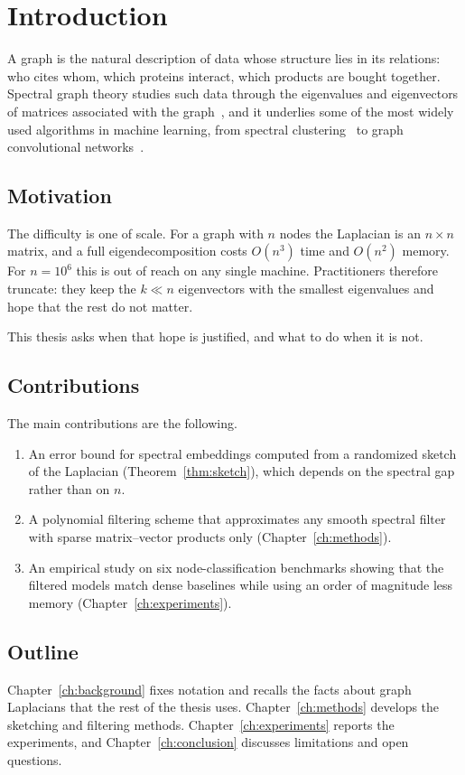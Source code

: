 \chapter{Introduction}
\label{ch:introduction}

A graph is the natural description of data whose structure lies in its relations: who cites whom, which proteins interact, which products are bought together. Spectral graph theory studies such data through the eigenvalues and eigenvectors of matrices associated with the graph~\cite{chung1997spectral}, and it underlies some of the most widely used algorithms in machine learning, from spectral clustering~\cite{vonluxburg2007tutorial} to graph convolutional networks~\cite{kipf2017semi}.

\section{Motivation}

The difficulty is one of scale. For a graph with $n$ nodes the Laplacian is an $n \times n$ matrix, and a full eigendecomposition costs $O(n^3)$ time and $O(n^2)$ memory. For $n = 10^6$ this is out of reach on any single machine. Practitioners therefore truncate: they keep the $k \ll n$ eigenvectors with the smallest eigenvalues and hope that the rest do not matter.

This thesis asks when that hope is justified, and what to do when it is not.

\section{Contributions}

The main contributions are the following.
\begin{enumerate}
  \item An error bound for spectral embeddings computed from a randomized sketch of the Laplacian (Theorem~\ref{thm:sketch}), which depends on the spectral gap rather than on $n$.
  \item A polynomial filtering scheme that approximates any smooth spectral filter with sparse matrix--vector products only (Chapter~\ref{ch:methods}).
  \item An empirical study on six node-classification benchmarks showing that the filtered models match dense baselines while using an order of magnitude less memory (Chapter~\ref{ch:experiments}).
\end{enumerate}

\section{Outline}

Chapter~\ref{ch:background} fixes notation and recalls the facts about graph Laplacians that the rest of the thesis uses. Chapter~\ref{ch:methods} develops the sketching and filtering methods. Chapter~\ref{ch:experiments} reports the experiments, and Chapter~\ref{ch:conclusion} discusses limitations and open questions.
